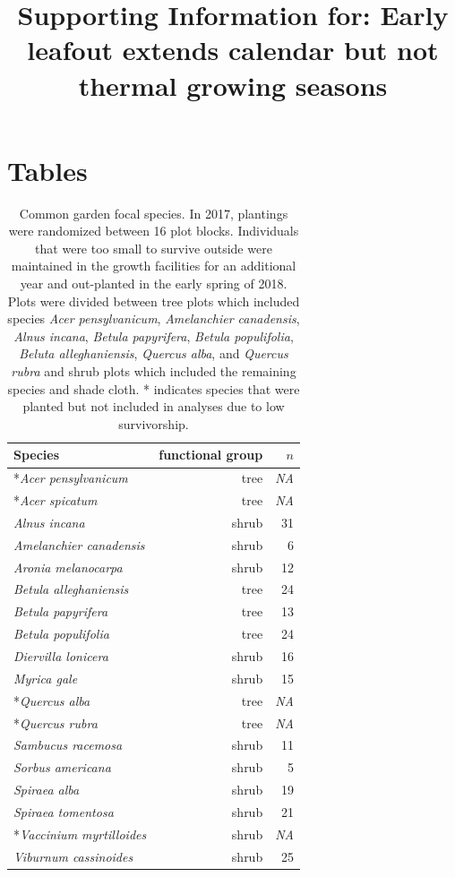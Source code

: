 \documentclass{article}[11pt]
\title{Supporting Information for: Early leafout extends calendar but not thermal growing seasons}
\begin{document}

\maketitle



\section{Tables}
\begin{table}[ht]
\centering
\begin{tabular}{lrr}
  \hline
Species & functional group & $n$ \\ 
  \hline
  *\emph{Acer pensylvanicum} & tree  &  \emph{NA}\\ 
  *\emph{Acer spicatum} & tree & \emph{NA}  \\ 
   \emph{Alnus incana} & shrub & 31 \\ 
   \emph{Amelanchier canadensis} &  shrub & 6  \\ 
 \emph{Aronia melanocarpa} & shrub & 12 \\ 
  \emph{Betula alleghaniensis} &  tree & 24\\ 
  \emph{Betula papyrifera} &   tree & 13 \\ 
  \emph{Betula populifolia} &  tree & 24\\ 
  \emph{Diervilla lonicera} &  shrub  & 16 \\ 
  \emph{Myrica gale} &  shrub & 15\\ 
  *\emph{Quercus alba} &  tree & \emph{NA}\\ 
  *\emph{Quercus rubra} &  tree & \emph{NA}\\ 
  \emph{Sambucus racemosa} &  shrub & 11\\ 
  \emph{Sorbus americana} &  shrub & 5\\
  \emph{Spiraea alba} &  shrub & 19\\ 
  \emph{Spiraea tomentosa} &   shrub & 21 \\ 
 *\emph{Vaccinium myrtilloides} &  shrub & \emph{NA}\\ 
 \emph{Viburnum cassinoides} &  shrub & 25 \\ 
  \end{tabular}
  \caption{Common garden focal species. In 2017, plantings were randomized between 16 plot blocks. Individuals that were too small to survive outside were maintained in the growth facilities for an additional year and out-planted in the early spring of 2018. Plots were divided between tree plots which included species \textit{Acer pensylvanicum}, \textit{Amelanchier canadensis}, \textit{Alnus incana}, \textit{Betula papyrifera}, \textit{Betula populifolia}, \textit{Beluta alleghaniensis}, \textit{Quercus alba}, and \textit{Quercus rubra} and shrub plots which included the remaining species and shade cloth. * indicates species that were planted but not included in analyses due to low survivorship.}
  \label{listSp}
\end{table}
\end{document}
